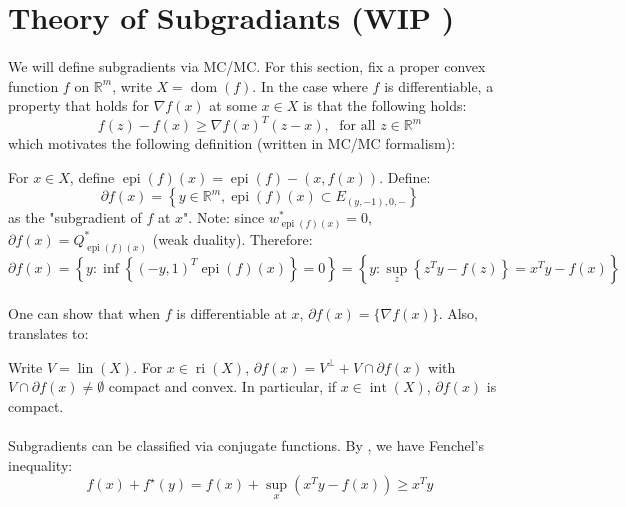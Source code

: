 \section{Theory of Subgradiants (WIP \faWrench)}
\label{sect:046}

\paragraph{}We will define subgradients via MC/MC. For this section, fix a proper convex function $f$ on $\mathbb{R}^m$, write $X=\operatorname{dom}(f)$. In the case where $f$ is differentiable, a property that holds for $\nabla f(x)$ at some $x\in X$ is that the following holds:
\[
	f(z)-f(x)\geq \nabla f(x)^T(z-x),\; \text{ for all }z\in \mathbb{R}^m
\]
which motivates the following definition (written in MC/MC formalism):

\begin{defn}[Subgradients]\label{defn-subgradients}
	For $x\in X$, define $\operatorname{epi}(f)(x) = \operatorname{epi}(f) - (x,f(x))$. Define:
	\[
		\partial f(x) = \left\{
		y\in \mathbb{R}^m,
		\operatorname{epi}(f)(x)\subset E_{(y,-1),0,-}
		\right\}
	\]
	as the "subgradient of $f$ at $x$". Note: since $w^\ast_{\operatorname{epi}(f)(x)}=0$, $\partial f(x)=Q^\ast_{\operatorname{epi}(f)(x)}$ (weak duality). Therefore:
	\[
		\partial f(x) = \left\{y:\inf\left\{(-y,1)^T \operatorname{epi}(f)(x)\right\}=0\right\}=\left\{y:\sup_z \left\{ z^Ty-f(z)\right\}=x^Ty-f(x)\right\}
	\]
\end{defn}

\paragraph{}One can show that when $f$ is differentiable at $x$, $\partial f(x)=\{\nabla f(x)\}$. Also,  translates to:

\begin{prop}\label{prop:046-set-of-subgrad}
	Write $V=\operatorname{lin}(X)$. For $x\in \operatorname{ri}(X)$, $\partial f(x) = V^\perp + V\cap \partial f(x)$ with $V\cap \partial f(x)\neq\emptyset$ compact and convex. In particular, if $x\in \operatorname{int}(X)$, $\partial f(x)$ is compact.
\end{prop}

\paragraph{}Subgradients can be classified via conjugate functions. By , we have Fenchel's inequality:
\[
	f(x) + f^\star(y) = f(x) + \sup_{x}(x^Ty-f(x)) \geq x^Ty
\]


